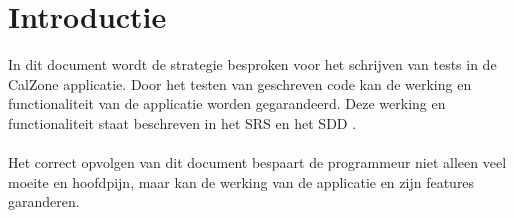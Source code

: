 \chapter{Introductie}
In dit document wordt de strategie besproken voor het schrijven van tests in de CalZone \cite{calzone} applicatie. Door het testen van geschreven code kan de werking en functionaliteit van de applicatie worden gegarandeerd. Deze werking en functionaliteit staat beschreven in het SRS \cite{srs} en het SDD \cite{sdd}.
\\
\\
Het correct opvolgen van dit document bespaart de programmeur niet alleen veel moeite en hoofdpijn, maar kan de werking van de applicatie en zijn features garanderen. 